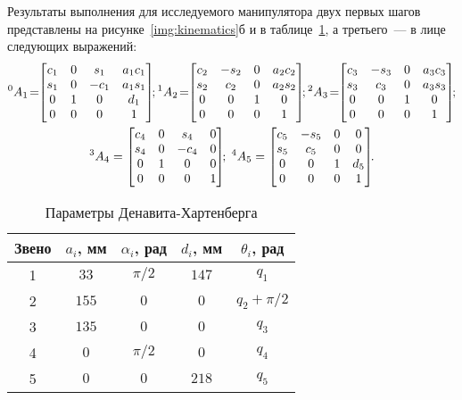 Результаты выполнения для исследуемого манипулятора двух первых шагов представлены на рисунке~\ref{img:kinematics}б и в таблице~\ref{table_DH_params}, а третьего~--- в лице следующих выражений:
\begin{gather}
	{}^0A_1\! =\!\!
    \left[\begin{matrix}c_1 & 0 & s_1 & a_{1} c_1\\s_1 & 0 & - c_1 & a_{1} s_1\\0 & 1 & 0 & d_{1}\\0 & 0 & 0 & 1\end{matrix}\right]\!\!;
	{}^1A_2\! =\!\!
	\left[\begin{matrix}c_2 & - s_2 & 0 & a_{2} c_2\\s_2 & c_2 & 0 & a_{2} s_2\\0 & 0 & 1 & 0\\0 & 0 & 0 & 1\end{matrix}\right]\!\!;
	{}^2A_3\! =\!\!
	\left[\begin{matrix}c_3 & - s_3 & 0 & a_{3} c_3\\s_3 & c_3 & 0 & a_{3} s_3\\0 & 0 & 1 & 0\\0 & 0 & 0 & 1\end{matrix}\right]\!\!;\notag
	\\
	{}^3A_4 =
	 \left[\begin{matrix}c_4 & 0 & s_4 & 0\\s_4 & 0 & - c_4 & 0\\0 & 1 & 0 & 0\\0 & 0 & 0 & 1\end{matrix}\right]\!\!;
	\;
	{}^4A_5 =
	\left[\begin{matrix}c_5 & - s_5 & 0 & 0\\s_5 & c_5 & 0 & 0\\0 & 0 & 1 & d_{5}\\0 & 0 & 0 & 1\end{matrix}\right]\!\!\ldotp
	\label{eq_all_ht_matrices}
\end{gather}

\begin{table}[h!]
	\caption{Параметры Денавита-Хартенберга}
	\begin{center}
		\begin{tabular}{|c|c|c|c|c|}
			\hline
			Звено 	& $a_i$, мм & $\alpha_i$, рад & $d_i$, мм & $\theta_i$, рад\\
			\hline
			1  		& $33$ & $\pi/2$ & $147$ & $q_1$\\
			\hline	
			2 		& $155$ & $0$ 	& $0$ 	& $q_2 + \pi/2$\\
			\hline
			3 		& $135$ & $0$ 	& $0$ 	& $q_3$\\
			\hline
			4 		& $0$ & $\pi/2$ & $0$ 	& $q_4$\\
			\hline
			5 		& $0$ & $0$ 	& $218$ & $q_5$\\
			\hline
		\end{tabular}
	\end{center}
	\label{table_DH_params}
\end{table}


